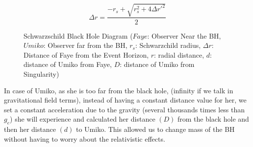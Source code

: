 \documentclass[9pt,a4paper,twocolumn,twoside]{tau-class/tau}
\begin{document}
    \begin{equation}
        \boxed{\Delta r = \frac{-r_s + \sqrt{r_s^2 + 4 \Delta r'^2}}{2}}
    \end{equation}

    \begin{figure*}[t]
        \centering
        \caption{Schwarzschild Black Hole Diagram ($Faye$: Observer Near the BH, $Umiko$: Observer far from the BH, $r_s$: Schwarzchild radius, $\Delta r$: Distance of Faye from the Event Horizon, $r$: radial distance, $d$: distance of Umiko from Faye, $D$: distance of Umiko from Singularity)}
        \label{fig:blackhole}
  
      \end{figure*}


      In case of Umiko, as she is too far from the black hole, (infinity if we talk in gravitational field terms), instead of having a constant distance value for her, we set a constant acceleration due to the gravity (several thousands times less than \(g_e\)) she will experience and calculated her distance \((D)\) from the black hole and then her distance \((d)\) to Umiko. This allowed us to change mass of the BH without having to worry about the relativistic effects. 
\end{document}
